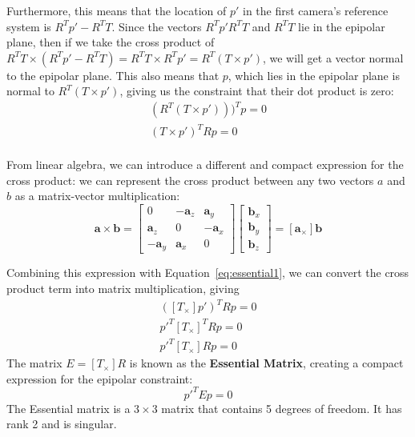 \documentclass[a4paper, 12pt]{article}
\renewcommand\emph{\textbf}
\begin{document}
Furthermore, this means that the location of $p'$ in the first camera's reference system is $R^Tp' - R^TT$. Since the vectors $R^Tp' R^TT$ and $R^TT$ lie in the epipolar plane, then if we take the cross product of $R^TT\times(R^Tp' -R^T T) = R^TT \times R^Tp' = R^T(T \times p')$, we will get a vector normal to the epipolar plane. This also means that $p$, which lies in the epipolar plane is normal to $R^T(T\times p')$, giving us the constraint that their dot product is zero:
\begin{equation}
    \begin{split}
    	(R^T(T\times p')))^T p = 0\\
    	(T\times p')^T R p = 0 \\ 
    \end{split}
    \label{eq:essential1}
\end{equation}

From linear algebra, we can introduce a different and compact expression for the cross product: we can represent the cross product between any two vectors $a$ and $b$ as a matrix-vector multiplication:
\begin{equation}
    \mathbf{a}\times \mathbf{b} = \begin{bmatrix} 0 & -\mathbf{a}_z & \mathbf{a}_y \\ \mathbf{a}_z & 0 & -\mathbf{a}_x \\ -\mathbf{a}_y & \mathbf{a}_x & 0\end{bmatrix}\begin{bmatrix} \mathbf{b}_x \\ \mathbf{b}_y \\ \mathbf{b}_z\end{bmatrix} = [\mathbf{a}_\times] \mathbf{b}
\end{equation}

Combining this expression with Equation~\ref{eq:essential1}, we can convert the cross product term into matrix multiplication, giving
\begin{equation}
    \begin{split}
        ([T_\times] p')^T R p = 0 \\ 
    	  p'^T [T_\times]^T R p = 0 \\
	  p'^T [T_\times] R p = 0
    \end{split}
\end{equation}
The matrix $E = [T_\times]R$ is known as the \emph{Essential Matrix}, creating a compact expression for the epipolar constraint: 
\begin{equation}
    p'^T E p = 0
\end{equation}
The Essential matrix is a $3\times3$ matrix that contains 5 degrees of freedom. It has rank 2 and is singular. 
\end{document}
